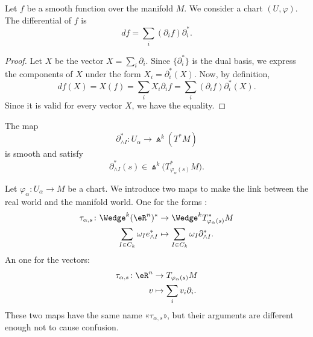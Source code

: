 \begin{lemma}  \label{LEMooGEFSooVlPLOs}
	Let \( f\) be a smooth function over the manifold \( M\). We consider a chart \( (U,\varphi)\). The differential of \( f\) is
	\begin{equation}
		df=\sum_i(\partial_if)\partial^*_i.
	\end{equation}
\end{lemma}

\begin{proof}
	Let \( X\) be the vector \( X=\sum_i\partial_i\). Since \( \{ \partial^*_i \}\) is the dual basis, we express the components of \( X\) under the form \( X_i=\partial_i^*(X)\). Now, by definition,
	\begin{equation}
		df(X)=X(f)=\sum_iX_i\partial_if=\sum_i(\partial_if)\partial_i^*(X).
	\end{equation}
	Since it is valid for every vector \( X\), we have the equality.
\end{proof}

\begin{lemma}		\label{LEMooIAASooDnnhRA}
	The map
	\begin{equation}
		\partial^*_{\wedge I}\colon U_{\alpha} \to \Wedge^k(T^*M)
	\end{equation}
	is smooth and satisfy
	\begin{equation}
		\partial_{\wedge I}^*(s)\in\Wedge^k\big( T^*_{\varphi_{\alpha}(s)}M \big).
	\end{equation}
\end{lemma}

\begin{normaltext}		\label{NORMooDQEZooHaJPoa}
	Let \(\varphi_{\alpha} \colon U_{\alpha}\to M  \) be a chart. We introduce two maps to make the link between the real world and the manifold world. One for the forms :
	\begin{equation}
		\begin{aligned}
			\tau_{\alpha,s}\colon \Wedge^k(\eR^n)^* & \to \Wedge^kT^*_{\varphi_{\alpha}(s)}M                \\
			\sum_{I\in C_k}\omega_Ie^*_{\wedge I}   & \mapsto \sum_{I\in C_k}\omega_I\partial^*_{\wedge I}.
		\end{aligned}
	\end{equation}
	An one for the vectors:
	\begin{equation}
		\begin{aligned}
			\tau_{\alpha,s}\colon \eR^n & \to T_{\varphi_{\alpha}(s)}M \\
			v                           & \mapsto \sum_iv_i\partial_i.
		\end{aligned}
	\end{equation}
	These two maps have the same name «\( \tau_{\alpha,s}\)», but their arguments are different enough not to cause confusion.
\end{normaltext}


